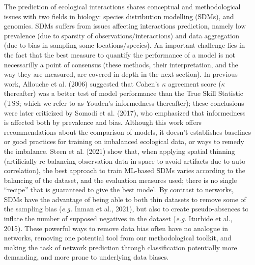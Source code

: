 \documentclass[11pt]{article}
\begin{document}
The prediction of ecological interactions shares conceptual and
methodological issues with two fields in biology: species distribution
modelling (SDMs), and genomics. SDMs suffers from issues affecting
interactions prediction, namely low prevalence (due to sparsity of
observations/interactions) and data aggregation (due to bias in sampling
some locations/species). An important challenge lies in the fact that
the best measure to quantify the performance of a model is not
necessarilly a point of consensus (these methods, their interpretation,
and the way they are measured, are covered in depth in the next
section). In previous work, Allouche et al. (2006) suggested that
Cohen's \(\kappa\) agreement score (\(\kappa\) thereafter) was a better
test of model performance than the True Skill Statistic (TSS; which we
refer to as Youden's informedness thereafter); these conclusions were
later criticized by Somodi et al. (2017), who emphasized that
informedness is affected both by prevalence and bias. Although this work
offers recommendations about the comparison of models, it doesn't
establishes baselines or good practices for training on imbalanced
ecological data, or ways to remedy the imbalance. Steen et al. (2021)
show that, when applying spatial thinning (artificially re-balancing
observation data in space to avoid artifacts due to auto-correlation),
the best approach to train ML-based SDMs varies according to the
balancing of the dataset, and the evaluation measures used; there is no
single ``recipe'' that is guaranteed to give the best model. By contrast
to networks, SDMs have the advantage of being able to both thin datasets
to remove some of the sampling bias (\emph{e.g.} Inman et al., 2021),
but also to create pseudo-absences to inflate the number of supposed
negatives in the dataset (\emph{e.g.} Iturbide et al., 2015). These
powerful ways to remove data bias often have no analogue in networks,
removing one potential tool from our methodological toolkit, and making
the task of network prediction through classification potentially more
demanding, and more prone to underlying data biases.
\end{document}
